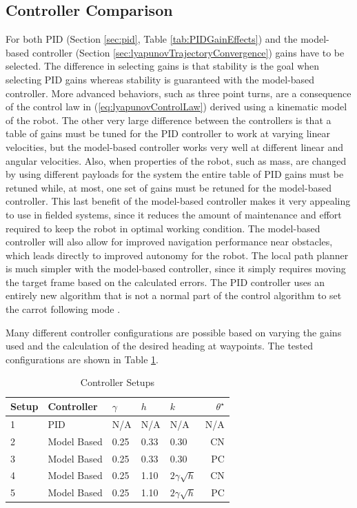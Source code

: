 \subsection{Controller Comparison}
\label{sec:controllerComparison}
For both PID (Section \ref{sec:pid}, Table \ref{tab:PIDGainEffects}) and the model-based controller (Section \ref{sec:lyapunovTrajectoryConvergence}) gains have to be selected. The difference in selecting gains is that stability is the goal when selecting PID gains whereas stability is guaranteed with the model-based controller. More advanced behaviors, such as three point turns, are a consequence of the control law in (\ref{eq:lyapunovControlLaw}) derived using a kinematic model of the robot. The other very large difference between the controllers is that a table of gains must be tuned for the PID controller to work at varying linear velocities, but the model-based controller works very well at different linear and angular velocities. Also, when properties of the robot, such as mass, are changed by using different payloads for the system the entire table of PID gains must be retuned while, at most, one set of gains must be retuned for the model-based controller. This last benefit of the model-based controller makes it very appealing to use in fielded systems, since it reduces the amount of maintenance and effort required to keep the robot in optimal working condition. The model-based controller will also allow for improved navigation performance near obstacles, which leads directly to improved autonomy for the robot. The local path planner is much simpler with the model-based controller, since it simply requires moving the target frame based on the calculated errors. The PID controller uses an entirely new algorithm that is not a normal part of the control algorithm to set the carrot following mode \cite{Hogg02}.

Many different controller configurations are possible based on varying the gains used and the calculation of the desired heading at waypoints. The tested configurations are shown in Table \ref{tab:resultsControllersSetup}.

\begin{table}[ht!]
\caption{Controller Setups}
\small
\centering
\begin{tabular}{@{}lllllr@{}} \toprule
Setup & Controller  & $\gamma$ & $h$  & $k$               & $\theta^\star$ \\ \midrule
1     & PID         & N/A      & N/A  & N/A               & N/A \\
2     & Model Based & 0.25     & 0.33 & 0.30              & CN \\
3     & Model Based & 0.25     & 0.33 & 0.30              & PC \\
4     & Model Based & 0.25     & 1.10 & $2\gamma\sqrt{h}$ & CN \\
5     & Model Based & 0.25     & 1.10 & $2\gamma\sqrt{h}$ & PC \\ \bottomrule
\end{tabular}
\label{tab:resultsControllersSetup}
\end{table}

